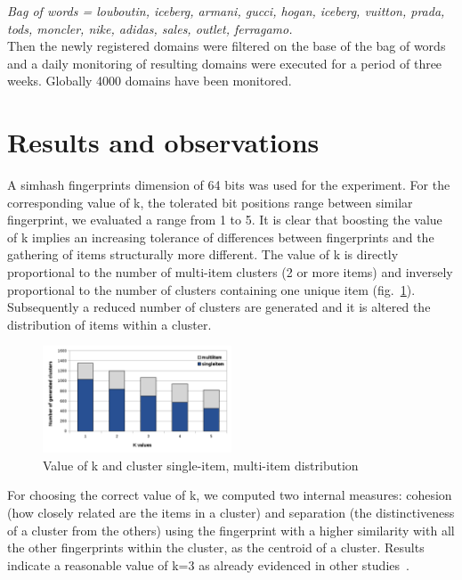\documentclass{easychair}
\begin{document}
{\textit{Bag of words =  {louboutin, iceberg, armani, gucci, hogan, iceberg, vuitton, prada, tods, moncler, nike, adidas, sales, outlet, ferragamo}.}}
\\

Then the newly registered domains were filtered on the base of the bag of words and a daily monitoring of resulting domains were executed for a period of three weeks. Globally 4000 domains have been monitored. 

\section{Results and observations}
\label{sect:Results and observations}

A simhash fingerprints dimension of 64 bits was used for the experiment. For the corresponding value of k, the tolerated bit positions range between similar fingerprint, we evaluated a range from 1 to 5. It is clear that boosting the value of k implies an increasing tolerance of differences between fingerprints and the gathering of items structurally more different. The value of k is directly proportional to the number of multi-item clusters (2 or more items) and inversely proportional to the number of clusters containing one unique item (fig.~\ref{fig:3}). Subsequently a reduced number of clusters are generated and it is altered the distribution of items within a cluster.

\begin{figure}[ht]
  \begin{centering}
  \includegraphics[width=0.5\textwidth]{3.png}
  \caption{Value of k  and cluster single-item, multi-item distribution}
  \label{fig:3}
  \end{centering}
\end{figure}

For choosing the correct value of k, we computed two internal measures: cohesion (how closely related are the items in a cluster) and separation (the distinctiveness of a cluster from the others) using the fingerprint with a higher similarity with all the other fingerprints within the cluster, as the centroid of a cluster. Results indicate a reasonable value of k=3 as already evidenced in other studies~\cite{Manku:2007:DNW:1242572.1242592}.
\end{document}
